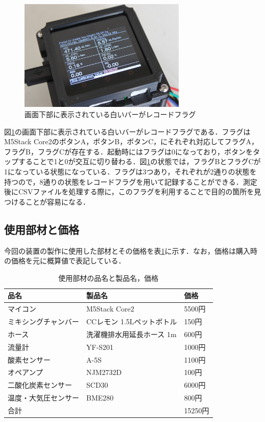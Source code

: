 \begin{figure}[H]
  \begin{center}
    \includegraphics[width=8cm]{fig/record_flag}
    \caption{画面下部に表示されている白いバーがレコードフラグ}
    \label{fig:record_flag}
  \end{center}
\end{figure}

図\ref{fig:record_flag}の画面下部に表示されている白いバーがレコードフラグである．フラグはM5Stack Core2のボタンA，ボタンB，ボタンC，にそれぞれ対応してフラグA，フラグB，フラグCが存在する．起動時にはフラグは0になっており，ボタンをタップすることで1と0が交互に切り替わる．図\ref{fig:record_flag}の状態では，フラグBとフラグCが1になっている状態になっている．フラグは3つあり，それぞれが2通りの状態を持つので，8通りの状態をレコードフラグを用いて記録することができる．測定後にCSVファイルを処理する際に，このフラグを利用することで目的の箇所を見つけることが容易になる．

\subsection{使用部材と価格}

今回の装置の製作に使用した部材とその価格を表\ref{tb:price_of_material}に示す．なお，価格は購入時の価格を元に概算値で表記している．

\begin{table}[H]
\begin{center}
\caption{使用部材の品名と製品名，価格}
\label{tb:price_of_material}
\begin{tabular}{|l|l|l|}
\hline
品名         & 製品名              & 価格     \\ \hline
マイコン       & M5Stack Core2    & 5500円  \\ \hline
ミキシングチャンバー & CCレモン 1.5Lペットボトル & 150円   \\ \hline
ホース        & 洗濯機排水用延長ホース 1m      & 600円   \\ \hline
流量計        & YF-S201          & 1000円  \\ \hline
酸素センサー     & A-5S             & 1100円  \\ \hline
オペアンプ      & NJM2732D         & 100円   \\ \hline
二酸化炭素センサー  & SCD30            & 6000円  \\ \hline
温度・大気圧センサー & BME280           & 800円   \\ \hline
\multicolumn{2}{|l|}{合計}      & 15250円 \\ \hline
\end{tabular}
\end{center}
\end{table}


